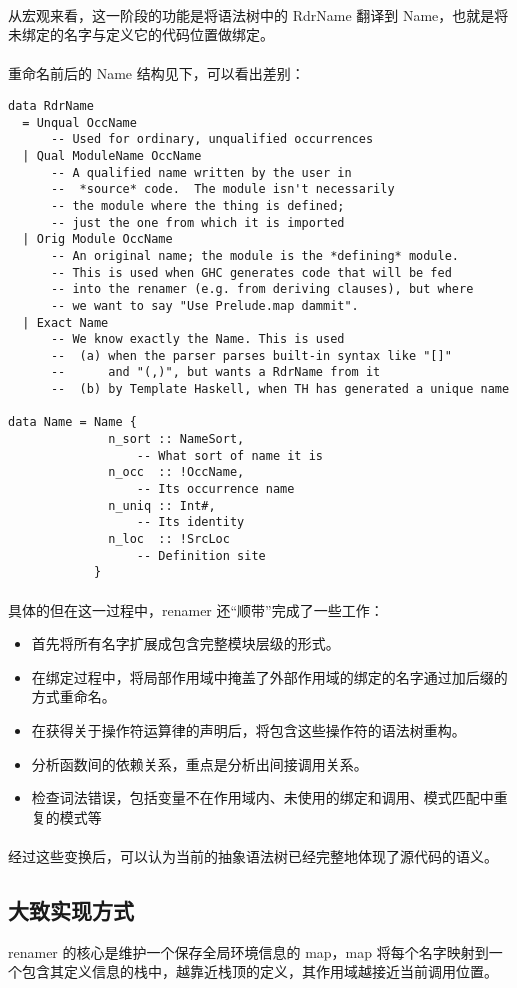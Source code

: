 \documentclass{article}
\begin{document}
	\paragraph{}
	从宏观来看，这一阶段的功能是将语法树中的 RdrName 翻译到 Name，也就是将未绑定的名字与定义它的代码位置做绑定。
	\paragraph{}
	重命名前后的 Name 结构见下，可以看出差别：
\begin{verbatim}
data RdrName 
  = Unqual OccName
      -- Used for ordinary, unqualified occurrences 
  | Qual ModuleName OccName
      -- A qualified name written by the user in 
      --  *source* code.  The module isn't necessarily 
      -- the module where the thing is defined; 
      -- just the one from which it is imported
  | Orig Module OccName
      -- An original name; the module is the *defining* module.
      -- This is used when GHC generates code that will be fed
      -- into the renamer (e.g. from deriving clauses), but where
      -- we want to say "Use Prelude.map dammit".  
  | Exact Name
      -- We know exactly the Name. This is used 
      --  (a) when the parser parses built-in syntax like "[]" 
      --      and "(,)", but wants a RdrName from it
      --  (b) by Template Haskell, when TH has generated a unique name	
      
data Name = Name {
              n_sort :: NameSort,
                  -- What sort of name it is
              n_occ  :: !OccName,
                  -- Its occurrence name
              n_uniq :: Int#,
                  -- Its identity
              n_loc  :: !SrcLoc
                  -- Definition site
            }
\end{verbatim}
	\paragraph{}
	具体的但在这一过程中，renamer 还“顺带”完成了一些工作：
	\begin{itemize}
		\item 首先将所有名字扩展成包含完整模块层级的形式。
		\item 在绑定过程中，将局部作用域中掩盖了外部作用域的绑定的名字通过加后缀的方式重命名。
		\item 在获得关于操作符运算律的声明后，将包含这些操作符的语法树重构。
		\item 分析函数间的依赖关系，重点是分析出间接调用关系。
		\item 检查词法错误，包括变量不在作用域内、未使用的绑定和调用、模式匹配中重复的模式等
	\end{itemize}
	\paragraph{}
	经过这些变换后，可以认为当前的抽象语法树已经完整地体现了源代码的语义。
	\subsection{大致实现方式}
	renamer 的核心是维护一个保存全局环境信息的 map，map 将每个名字映射到一个包含其定义信息的栈中，越靠近栈顶的定义，其作用域越接近当前调用位置。
\end{document}

